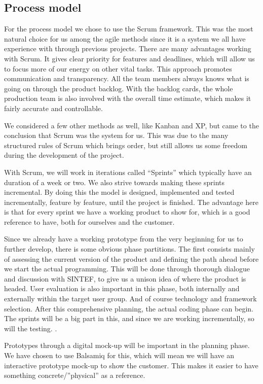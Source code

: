 	\subsection{Process model}
For the process model we chose to use the Scrum framework. This was the most natural choice for us among the agile methods since it is a system we all have experience with through previous projects. There are many advantages working with Scrum. It gives clear priority for features and deadlines, which will allow us to focus more of our energy on other vital tasks. This approach promotes communication and transparency. All the team members always knows what is going on through the product backlog. With the backlog cards, the whole production team is also involved with the overall time estimate, which makes it fairly accurate and controllable.

We considered a few other methods as well, like Kanban and XP, but came to the conclusion that Scrum was the system for us. This was due to the many structured rules of Scrum which brings order, but still allows us some freedom during the development of the project.

With Scrum, we will work in iterations called “Sprints” which typically have an duration of a week or two. We also strive towards making these sprints incremental. By doing this the model is designed, implemented and tested incrementally, feature by feature, until the project is finished. The advantage here is that for every sprint we have a working product to show for, which is a good reference to have, both for ourselves and the customer. 

Since we already have a working prototype from the very beginning for us to further develop, there is some obvious phase partitions. The first consists mainly of assessing the current version of the product and defining the path ahead before we start the actual programming. This will be done through thorough dialogue and discussion with SINTEF, to give us a unison idea of where the product is headed. User evaluation is also important in this phase, both internally and externally within the target user group. And of course technology and framework selection. After this comprehensive planning, the actual coding phase can begin. The sprints will be a big part in this, and since we are working incrementally, so will the testing. .

Prototypes through a digital mock-up will be important in the planning phase. We have chosen to use Balsamiq for this, which will mean we will have an interactive prototype mock-up to show the customer. This makes it easier to have something concrete/”physical” as a reference.

